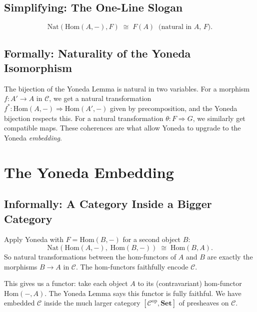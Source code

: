 \subsection{Simplifying: The One-Line Slogan}

\begin{equation*}
  \boxed{\;\;
    \mathrm{Nat}(\mathrm{Hom}(A,-), F) \;\cong\; F(A)
    \;\;\text{(natural in $A$, $F$).}
  \;\;}
\end{equation*}

\subsection{Formally: Naturality of the Yoneda Isomorphism}

The bijection of the Yoneda Lemma is natural in two variables. For a
morphism $f : A' \to A$ in $\mathcal{C}$, we get a natural transformation
$f^* : \mathrm{Hom}(A, -) \Rightarrow \mathrm{Hom}(A', -)$ given by
precomposition, and the Yoneda bijection respects this. For a natural
transformation $\theta : F \Rightarrow G$, we similarly get compatible
maps. These coherences are what allow Yoneda to upgrade to the Yoneda
\emph{embedding}.


\section{The Yoneda Embedding}
\label{sec:yoneda-embedding}

\subsection{Informally: A Category Inside a Bigger Category}

Apply Yoneda with $F = \mathrm{Hom}(B, -)$ for a second object $B$:
\begin{equation*}
  \mathrm{Nat}(\mathrm{Hom}(A, -),\; \mathrm{Hom}(B, -)) \;\cong\; \mathrm{Hom}(B, A).
\end{equation*}
So natural transformations between the hom-functors of $A$ and $B$ are
exactly the morphisms $B \to A$ in $\mathcal{C}$. The hom-functors faithfully
encode $\mathcal{C}$.

This gives us a functor: take each object $A$ to its (contravariant)
hom-functor $\mathrm{Hom}(-, A)$. The Yoneda Lemma says this functor is
fully faithful. We have embedded $\mathcal{C}$ inside the much larger
category $[\mathcal{C}^{\mathrm{op}}, \mathbf{Set}]$ of presheaves on
$\mathcal{C}$.


